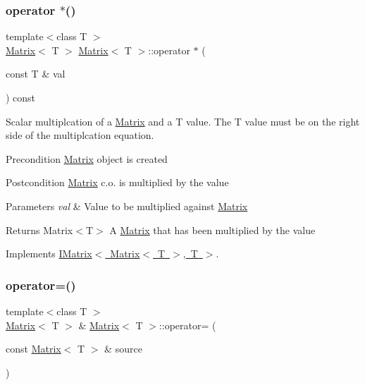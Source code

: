 \subsubsection{\texorpdfstring{operator $\ast$()}{operator *()}}
{\footnotesize\ttfamily template$<$class T $>$ \\
\mbox{\hyperlink{class_matrix}{Matrix}}$<$ T $>$ \mbox{\hyperlink{class_matrix}{Matrix}}$<$ T $>$\+::operator $\ast$ (\begin{DoxyParamCaption}\item[{const T \&}]{val }\end{DoxyParamCaption}) const\hspace{0.3cm}{\ttfamily [virtual]}}



Scalar multiplcation of a \mbox{\hyperlink{class_matrix}{Matrix}} and a T value. The T value must be on the right side of the multiplcation equation. 

\begin{DoxyPrecond}{Precondition}
\mbox{\hyperlink{class_matrix}{Matrix}} object is created 
\end{DoxyPrecond}
\begin{DoxyPostcond}{Postcondition}
\mbox{\hyperlink{class_matrix}{Matrix}} c.\+o. is multiplied by the value 
\end{DoxyPostcond}

\begin{DoxyParams}{Parameters}
{\em val} & Value to be multiplied against \mbox{\hyperlink{class_matrix}{Matrix}} \\
\hline
\end{DoxyParams}
\begin{DoxyReturn}{Returns}
Matrix$<$\+T$>$ A \mbox{\hyperlink{class_matrix}{Matrix}} that has been multiplied by the value 
\end{DoxyReturn}


Implements \mbox{\hyperlink{class_i_matrix}{I\+Matrix$<$ Matrix$<$ T $>$, T $>$}}.

\mbox{\label{class_matrix_a33c00fb6f2e9401d17d9ed615b965634}} 
\subsubsection{\texorpdfstring{operator=()}{operator=()}}
{\footnotesize\ttfamily template$<$class T $>$ \\
\mbox{\hyperlink{class_matrix}{Matrix}}$<$ T $>$ \& \mbox{\hyperlink{class_matrix}{Matrix}}$<$ T $>$\+::operator= (\begin{DoxyParamCaption}\item[{const \mbox{\hyperlink{class_matrix}{Matrix}}$<$ T $>$ \&}]{source }\end{DoxyParamCaption})\hspace{0.3cm}{\ttfamily [virtual]}}



